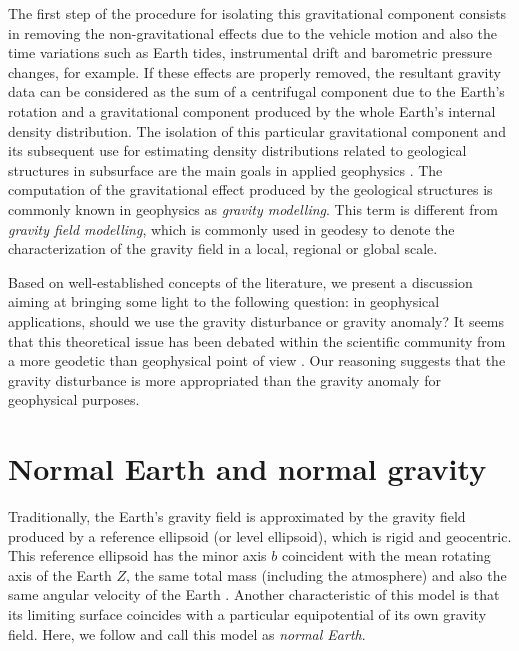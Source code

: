 \documentclass[extra]{gji}
\begin{document}
The first step of the procedure for isolating this 
gravitational component consists in removing the non-gravitational 
effects due to the vehicle motion and also the time variations 
such as Earth tides, instrumental drift and barometric 
pressure changes, for example.
If these effects are properly removed, the resultant 
gravity data can be considered as the sum of a 
centrifugal component due to the Earth's rotation and
a gravitational component produced by the whole Earth's
internal density distribution.
The isolation of this particular gravitational component 
and its subsequent use for estimating density 
distributions related to geological structures in subsurface 
are the main goals in applied geophysics \citep{blakely1996}.
The computation of the gravitational effect produced by
the geological structures is commonly known in geophysics as 
\textit{gravity modelling}.
This term is different from \textit{gravity field modelling}, which
is commonly used in geodesy to denote the characterization of the 
gravity field in a local, regional or global scale.

Based on well-established concepts of the literature,
we present a discussion aiming at bringing some
light to the following question: in geophysical applications,
should we use the gravity disturbance or gravity anomaly?
It seems that this theoretical issue has been 
debated within the scientific community from a 
more geodetic than geophysical point of view
\citep{lafehr1991,chapin1996,li2001,fairhead2003,
hackney-featherstone2003,hinze2005}.
Our reasoning suggests that the gravity 
disturbance is more appropriated than the gravity anomaly 
for geophysical purposes.


\section{Normal Earth and normal gravity}

Traditionally, the Earth's gravity field is approximated 
by the gravity field produced by a reference ellipsoid
(or level ellipsoid), which is rigid and geocentric.
This reference ellipsoid has the minor axis $b$ 
coincident with the mean rotating axis of the Earth $Z$, the 
same total mass (including the atmosphere) and also the
same angular velocity of the Earth \citep{heiskanen-moritz1967,
vanicek1987,hofmann-wellenhof-moritz2005,torge2012}.
Another characteristic of this model is that its
limiting surface coincides with a particular equipotential 
of its own gravity field.
Here, we follow \citep{torge2012} and call this model as
\textit{normal Earth}.
\end{document}
